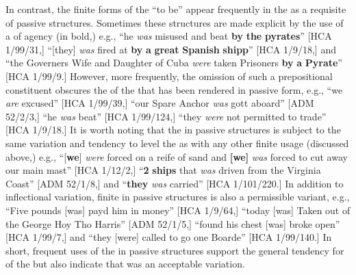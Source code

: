 In contrast, the finite forms of the  “to be” appear frequently in the  as a requisite of passive structures. Sometimes these structures are made explicit by the use of a  of agency (in bold,) e.g., “he \textit{was} misused and beat \textbf{by} \textbf{the} \textbf{pyrates}” [HCA 1/99/31,] “[they] \textit{was}\textbf{ }fired at \textbf{by} \textbf{a} \textbf{great} \textbf{Spanish} \textbf{shipp}” [HCA 1/9/18,] and “the Governers Wife and Daughter of Cuba \textit{were} taken Prisoners \textbf{by} \textbf{a} \textbf{Pyrate}” [HCA 1/99/9.] However, more frequently, the omission of such a prepositional constituent obscures the  of the  that has been rendered in passive form, e.g., “we \textit{are} excused” [HCA 1/99/39,] “our Spare Anchor \textit{was} gott aboard” [ADM 52/2/3,] “he \textit{was} beat” [HCA 1/99/124,] “they \textit{were} not permitted to trade” [HCA 1/9/18.] It is worth noting that the  in passive structures is subject to the same variation and tendency to level the  as with any other finite usage (discussed above,) e.g., “[\textbf{we}] \textit{were} forced on a reife of sand and \textbf{[we]} \textit{was} forced to cut away our main mast” [HCA 1/12/2,] “\textbf{2} \textbf{ships} that \textit{was} driven from the Virginia Coast” [ADM 52/1/8,] and “\textbf{they} \textit{was} carried” [HCA 1/101/220.] In addition to inflectional variation, finite  in passive structures is also a permissible variant, e.g., “Five pounds [was] payd him in money” [HCA 1/9/64,] “today [was] Taken out of the George Hoy Tho Harris” [ADM 52/1/5,] “found his chest [was] broke open” [HCA 1/99/7,] and “they [were] called to go one Boarde” [HCA 1/99/140.] In short, frequent uses of the  in passive structures support the general tendency for  of the  but also indicate that  was an acceptable variation. 

